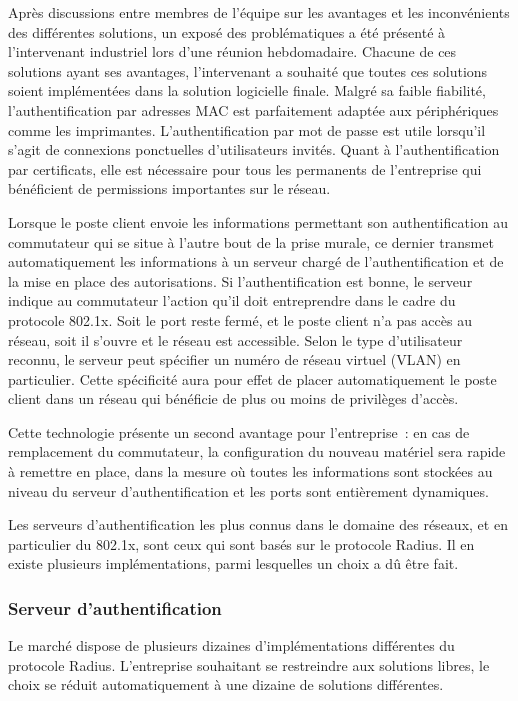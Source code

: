 Après discussions entre membres de l'équipe sur les avantages et les inconvénients des différentes solutions, un exposé des problématiques a été présenté à l'intervenant industriel lors d'une réunion hebdomadaire. Chacune de ces solutions ayant ses avantages, l'intervenant a souhaité que toutes ces solutions soient implémentées dans la solution logicielle finale. Malgré sa faible fiabilité, l'authentification par adresses MAC est parfaitement adaptée aux périphériques comme les imprimantes. L'authentification par mot de passe est utile lorsqu'il s'agit de connexions ponctuelles d'utilisateurs invités. Quant à l'authentification par certificats, elle est nécessaire pour tous les permanents de l'entreprise qui bénéficient de permissions importantes sur le réseau.

Lorsque le poste client envoie les informations permettant son authentification au commutateur qui se situe à l'autre bout de la prise murale, ce dernier transmet automatiquement les informations à un serveur chargé de l'authentification et de la mise en place des autorisations. Si l'authentification est bonne, le serveur indique au commutateur l'action qu'il doit entreprendre dans le cadre du protocole 802.1x. Soit le port reste fermé, et le poste client n'a pas accès au réseau, soit il s'ouvre et le réseau est accessible. Selon le type d'utilisateur reconnu, le serveur peut spécifier un numéro de réseau virtuel (VLAN) en particulier. Cette spécificité aura pour effet de placer automatiquement le poste client dans un réseau qui bénéficie de plus ou moins de privilèges d'accès.

Cette technologie présente un second avantage pour l'entreprise~: en cas de remplacement du commutateur, la configuration du nouveau matériel sera rapide à remettre en place, dans la mesure où toutes les informations sont stockées au niveau du serveur d'authentification et les ports sont entièrement dynamiques.

Les serveurs d'authentification les plus connus dans le domaine des réseaux, et en particulier du 802.1x, sont ceux qui sont basés sur le protocole Radius. Il en existe plusieurs implémentations, parmi lesquelles un choix a dû être fait.

\subsubsection{Serveur d'authentification}

Le marché dispose de plusieurs dizaines d'implémentations différentes du protocole Radius. L'entreprise souhaitant se restreindre aux solutions libres, le choix se réduit automatiquement à une dizaine de solutions différentes.

